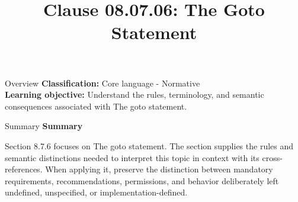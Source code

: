 \documentclass[10pt,letterpaper]{article}
\title{Clause 08.07.06: The Goto Statement}
\author{}
\date{}
\begin{document}
\maketitle
\begin{CornellOverviewBox}{Overview}
\textbf{Classification:} Core language - Normative\\[2pt]
\textbf{Learning objective:} Understand the rules, terminology, and semantic consequences associated with The goto statement.
\end{CornellOverviewBox}\begin{CornellSummaryBox}{Summary}
{\sffamily\bfseries\color{Accent} Summary}\par\vspace{3pt}Section 8.7.6 focuses on The goto statement. The section supplies the rules and semantic distinctions needed to interpret this topic in context with its cross-references. When applying it, preserve the distinction between mandatory requirements, recommendations, permissions, and behavior deliberately left undefined, unspecified, or implementation-defined.
\end{CornellSummaryBox}
\end{document}
